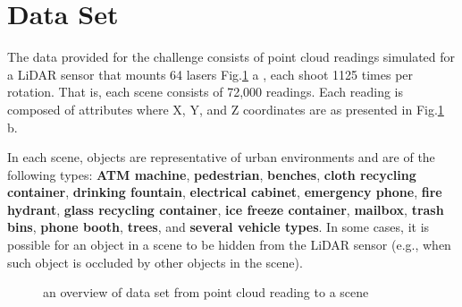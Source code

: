 \section{Data Set}

The data provided for the challenge consists of point cloud readings simulated for a LiDAR sensor that mounts 64 lasers Fig.\ref{fig:data_overview} a , each shoot 1125 times per rotation. That is, each scene consists of 72,000 readings. Each reading is composed of attributes where X, Y, and Z coordinates are as presented in Fig.\ref{fig:data_overview} b.

In each scene, objects are representative of urban environments and are of the following types: \textbf{ATM machine}, \textbf{pedestrian}, \textbf{benches}, \textbf{cloth recycling container}, \textbf{drinking fountain}, \textbf{electrical cabinet}, \textbf{emergency phone}, \textbf{fire hydrant}, \textbf{glass recycling container}, \textbf{ice freeze container}, \textbf{mailbox}, \textbf{trash bins}, \textbf{phone booth}, \textbf{trees}, and \textbf{several vehicle types}. In some cases, it is possible for an object in a scene to be hidden from the LiDAR sensor (e.g., when such object is occluded by other objects in the scene). 
\begin{figure}%
	\centering
	\qquad
	\caption{ an overview of data set from point cloud reading to a scene}%
	\label{fig:data_overview}%
\end{figure}



\cite{DEBSGC2019}


